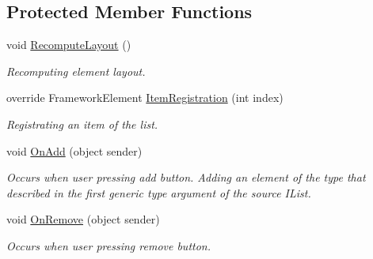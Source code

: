 \subsection*{Protected Member Functions}
\begin{DoxyCompactItemize}
\item 
void \mbox{\hyperlink{class_wpf_handler_1_1_u_i_1_1_controls_1_1_auto_collection_a01ab069c42e1737cebb4bb813ec8aa06}{Recompute\+Layout}} ()
\begin{DoxyCompactList}\small\item\em Recomputing element layout. \end{DoxyCompactList}\item 
override Framework\+Element \mbox{\hyperlink{class_wpf_handler_1_1_u_i_1_1_controls_1_1_auto_collection_a7cea6362ca2a31dca7bca6ab1f39142d}{Item\+Registration}} (int index)
\begin{DoxyCompactList}\small\item\em Registrating an item of the list. \end{DoxyCompactList}\item 
void \mbox{\hyperlink{class_wpf_handler_1_1_u_i_1_1_controls_1_1_auto_collection_ac229b39e23e0d2d9895f4897d1116e70}{On\+Add}} (object sender)
\begin{DoxyCompactList}\small\item\em Occurs when user pressing add button. Adding an element of the type that described in the first generic type argument of the source I\+List. \end{DoxyCompactList}\item 
void \mbox{\hyperlink{class_wpf_handler_1_1_u_i_1_1_controls_1_1_auto_collection_addd4df92578229539c28bc4db8121d68}{On\+Remove}} (object sender)
\begin{DoxyCompactList}\small\item\em Occurs when user pressing remove button. \end{DoxyCompactList}\end{DoxyCompactItemize}
